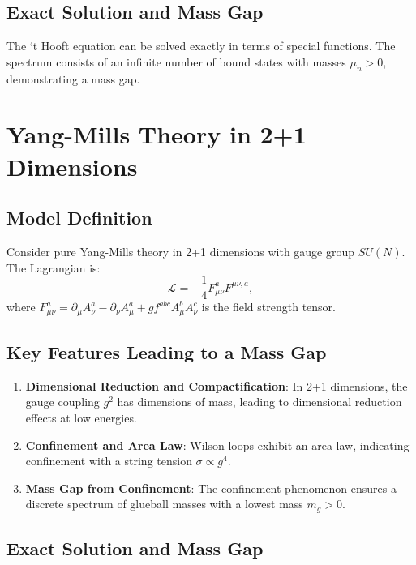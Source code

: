 \subsection{Exact Solution and Mass Gap}

The `t Hooft equation can be solved exactly in terms of special functions. The spectrum consists of an infinite number of bound states with masses \(\mu_n > 0\), demonstrating a mass gap.



\section{Yang-Mills Theory in 2+1 Dimensions}

\subsection{Model Definition}

Consider pure Yang-Mills theory in 2+1 dimensions with gauge group \(SU(N)\). The Lagrangian is:
\begin{equation}
\mathcal{L} = -\frac{1}{4} F_{\mu\nu}^a F^{\mu\nu,a},
\end{equation}
where \(F_{\mu\nu}^a = \partial_\mu A_\nu^a - \partial_\nu A_\mu^a + gf^{abc}A_\mu^b A_\nu^c\) is the field strength tensor.

\subsection{Key Features Leading to a Mass Gap}

\begin{enumerate}
    \item \textbf{Dimensional Reduction and Compactification}: In 2+1 dimensions, the gauge coupling \(g^2\) has dimensions of mass, leading to dimensional reduction effects at low energies.
    
    \item \textbf{Confinement and Area Law}: Wilson loops exhibit an area law, indicating confinement with a string tension \(\sigma \propto g^4\).
    
    \item \textbf{Mass Gap from Confinement}: The confinement phenomenon ensures a discrete spectrum of glueball masses with a lowest mass \(m_g > 0\).
\end{enumerate}

\subsection{Exact Solution and Mass Gap}

